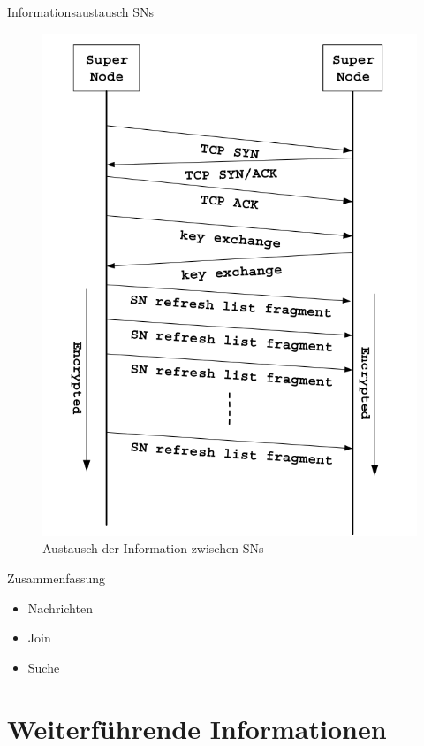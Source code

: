 \documentclass[ucs,9pt]{beamer}
\begin{document}
\begin{frame}{Informationsaustausch SNs}
\begin{figure}
\includegraphics[scale=0.25]{images/SnToSn}
\caption{Austausch der Information zwischen SNs}
\end{figure}
\end{frame}

\begin{frame}{Zusammenfassung}
\begin{itemize}
\item Nachrichten
\item Join
\item Suche
\end{itemize}
\end{frame}

\section{Weiterführende Informationen}
\end{document}
